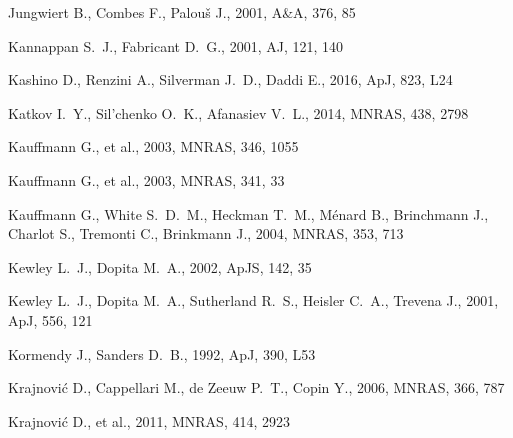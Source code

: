 \documentclass[a4paper,fleqn,usenatbib]{mnras}
\begin{document}
\begin{thebibliography}{}
 Jungwiert B., Combes F., Palou{\v s} J., 2001, A\&A, 376, 85 

 Kannappan S.~J., Fabricant D.~G., 2001, AJ, 121, 140 

 Kashino D., Renzini A., Silverman J.~D., Daddi E., 2016, ApJ, 823, L24 

 Katkov I.~Y., Sil'chenko O.~K., Afanasiev V.~L., 2014, MNRAS, 438, 2798 

 Kauffmann G., et al., 2003, MNRAS, 346, 1055 

 Kauffmann G., et al., 2003, MNRAS, 341, 33 

 Kauffmann G., White S.~D.~M., Heckman T.~M., M{\'e}nard B., Brinchmann J., Charlot S., Tremonti C., Brinkmann J., 2004, MNRAS, 353, 713 


 Kewley L.~J., Dopita M.~A., 2002, ApJS, 142, 35 


 Kewley L.~J., Dopita M.~A., Sutherland R.~S., Heisler C.~A., Trevena J., 2001, ApJ, 556, 121 

 Kormendy J., Sanders D.~B., 1992, ApJ, 390, L53 

 Krajnovi{\'c} D., Cappellari M., de Zeeuw P.~T., Copin Y., 2006, MNRAS, 366, 787 

 Krajnovi{\'c} D., et al., 2011, MNRAS, 414, 2923 


\end{thebibliography}
\end{document}
